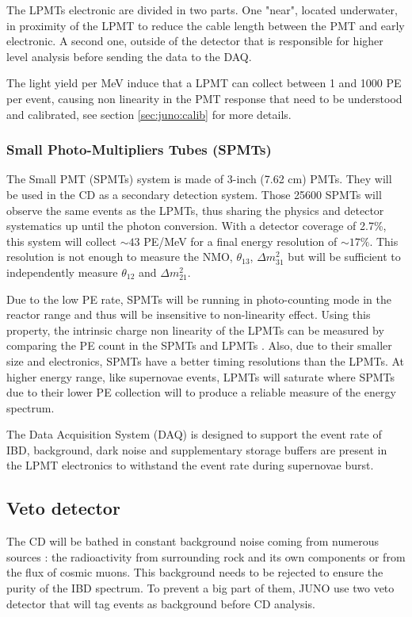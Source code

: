 The LPMTs electronic are divided in two parts. One "near", located underwater, in proximity of the LPMT to reduce the cable length between the PMT and early electronic. A second one, outside of the detector that is responsible for higher level analysis before sending the data to the DAQ.

The light yield per MeV induce that a LPMT can collect between 1 and 1000 PE per event, causing non linearity in the PMT response that need to be understood and calibrated, see section \ref{sec:juno:calib} for more details.

\subsubsection{Small Photo-Multipliers Tubes (SPMTs)}
\label{sec:juno:SPMT}

The Small PMT (SPMTs) system is made of 3-inch (7.62 cm) PMTs. They will be used in the CD as a secondary detection system. Those 25600 SPMTs will observe the same events as the LPMTs, thus sharing the physics and detector systematics up until the photon conversion. With a detector coverage of 2.7\%, this system will collect $\sim 43$ PE/MeV for a final energy resolution of $\sim 17\%$. This resolution is not enough to measure the NMO, $\theta_{13}$, $\Delta m^2_{31}$ but will be sufficient to independently measure $\theta_{12}$ and $\Delta m^2_{21}$.

Due to the low PE rate, SPMTs will be running in photo-counting mode in the reactor range and thus will be insensitive to non-linearity effect. Using this property, the intrinsic charge non linearity of the LPMTs can be measured by comparing the PE count in the SPMTs and LPMTs \cite{han_dual_2021}. Also, due to their smaller size and electronics, SPMTs have a better timing resolutions than the LPMTs.
At higher energy range, like supernovae events, LPMTs will saturate where SPMTs due to their lower PE collection will to produce a reliable measure of the energy spectrum.

The Data Acquisition System (DAQ) is designed to support the event rate of IBD, background, dark noise and supplementary storage buffers are present in the LPMT electronics to withstand the event rate during supernovae burst.

\subsection{Veto detector}

The CD will be bathed in constant background noise coming from numerous sources : the radioactivity from surrounding rock and its own components or from the flux of cosmic muons. This background needs to be rejected to ensure the purity of the IBD spectrum. To prevent a big part of them, JUNO use two veto detector that will tag events as background before CD analysis.

